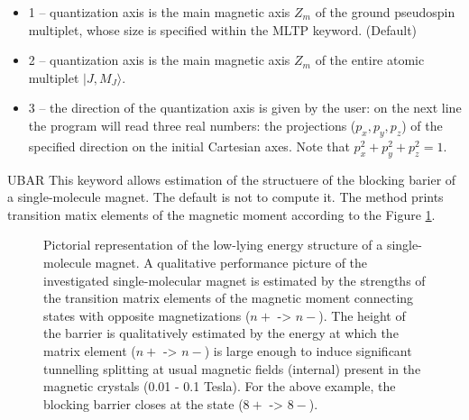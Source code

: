 \begin{keywordlist}
\begin{itemize}
 \item 1 -- quantization axis is the main magnetic axis $Z_m$ of the ground pseudospin multiplet, whose size is specified within the MLTP keyword. (Default)
 \item 2 -- quantization axis is the main magnetic axis $Z_m$ of the entire atomic multiplet $|J,M_{J}\rangle$.
 \item 3 -- the direction of the quantization axis is given by the user: on the next line the program will read three real numbers: the projections ($p_x, p_y, p_z$) of the specified direction on the initial Cartesian axes. Note that $p_{x}^{2} + p_{y}^{2} + p_{z}^{2} = 1$.
\end{itemize}






\item[UBAR]
This keyword allows estimation of the structuere of the blocking barier of a single-molecule magnet. The default is not to compute it.
The method prints transition matix elements of the magnetic moment according to the Figure \ref{fig:ubar}.

\begin{figure}
\centering
{}
\caption{Pictorial representation of the low-lying energy structure of a single-molecule magnet. A qualitative performance picture of the investigated single-molecular magnet is estimated by the strengths of the transition matrix elements of the magnetic moment connecting states with opposite magnetizations ($n+$ -> $n-$). The height of the barrier is qualitatively estimated by the energy at which the matrix element ($n+$ -> $n-$) is large enough to induce significant tunnelling splitting at usual magnetic fields (internal) present in the magnetic crystals (0.01 - 0.1 Tesla). For the above example, the blocking barrier closes at the state ($8+$ -> $8-$).}
\label{fig:ubar}
\end{figure}


\end{keywordlist}
